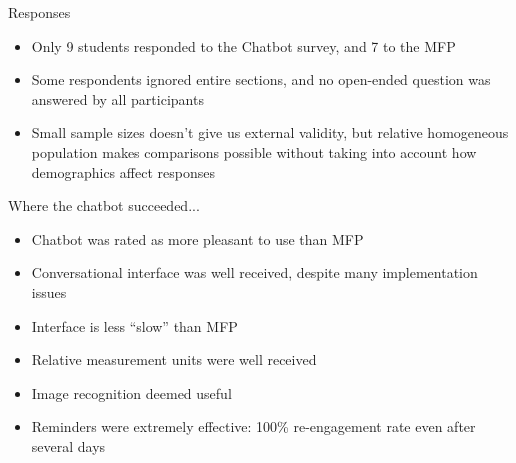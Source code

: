 \documentclass[landscape]{infslides}
\begin{document}
\begin{slide}{Responses}
    \begin{itemize}
        \item Only 9 students responded to the Chatbot survey, and 7 to the MFP
        \item Some respondents ignored entire sections, and no open-ended question was answered by all participants
        \item Small sample sizes doesn't give us external validity, but relative homogeneous population makes comparisons possible without taking into account how demographics affect responses
    \end{itemize}
\end{slide}
\begin{slide}{Where the chatbot succeeded...}
    \begin{itemize}
        \item Chatbot was rated as more pleasant to use than MFP
        \item Conversational interface was well received, despite many implementation issues
        \item Interface is less ``slow'' than MFP
        \item Relative measurement units were well received
        \item Image recognition deemed useful
        \item Reminders were extremely effective: 100\% re-engagement rate even after several days
    \end{itemize}
\end{slide}
\end{document}
